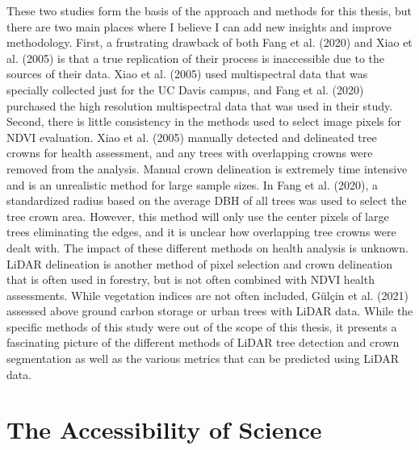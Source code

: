 \documentclass[12pt,twoside]{reedthesis}
\begin{document}
These two studies form the basis of the approach and methods for this
thesis, but there are two main places where I believe I can add new
insights and improve methodology. First, a frustrating drawback of both
Fang et al. (2020) and Xiao et al. (2005) is that a true replication of their process is
inaccessible due to the sources of their data. Xiao et al. (2005) used
multispectral data that was specially collected just for the UC Davis
campus, and Fang et al. (2020) purchased the high resolution multispectral data
that was used in their study. Second, there is little consistency in the
methods used to select image pixels for NDVI evaluation. Xiao et al. (2005)
manually detected and delineated tree crowns for health assessment, and
any trees with overlapping crowns were removed from the analysis. Manual
crown delineation is extremely time intensive and is an unrealistic
method for large sample sizes. In Fang et al. (2020), a standardized radius based
on the average DBH of all trees was used to select the tree crown area.
However, this method will only use the center pixels of large trees
eliminating the edges, and it is unclear how overlapping tree crowns
were dealt with. The impact of these different methods on health
analysis is unknown. LiDAR delineation is another method of pixel
selection and crown delineation that is often used in forestry, but is
not often combined with NDVI health assessments. While vegetation
indices are not often included, Gülçin et al. (2021) assessed above ground carbon
storage or urban trees with LiDAR data. While the specific methods of
this study were out of the scope of this thesis, it presents a
fascinating picture of the different methods of LiDAR tree detection and
crown segmentation as well as the various metrics that can be predicted
using LiDAR data.

\hypertarget{the-accessibility-of-science}{%
\section{The Accessibility of Science}\label{the-accessibility-of-science}}
\end{document}
